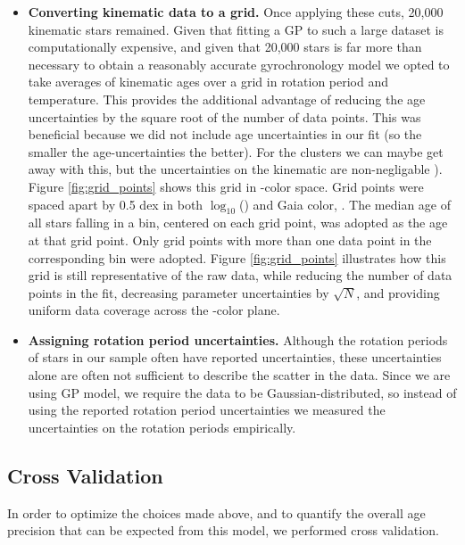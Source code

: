 \begin{itemize}
\item {\bf Converting kinematic data to a grid.}
Once applying these cuts, 20,000 kinematic stars remained.
        Given that fitting a GP to such a large dataset is computationally
        expensive, and given that 20,000 stars is far more than necessary to
        obtain a reasonably accurate gyrochronology model
        we opted to take averages of kinematic ages
        over a grid in rotation period and temperature.
This provides the additional advantage of reducing the age uncertainties by
        the square root of the number of data points.
        This was beneficial because we did not include age uncertainties in
        our fit (so the smaller the age-uncertainties the better).
For the clusters we can maybe get away with this, but the uncertainties on the
kinematic are non-negligable \citep[likely 1-2 Gyr][]{lu2021}).
Figure \ref{fig:grid_points} shows this grid in \prot-color space.
        Grid points were spaced apart by 0.5 dex in both $\log_{10}$(\prot)
        and Gaia color, \gcolor.
The median age of all stars falling in a bin, centered on each grid point, was
adopted as the age at that grid point.
Only grid points with more than one data point in the corresponding bin were
adopted.
Figure \ref{fig:grid_points} illustrates how this grid is still representative
of the raw data, while reducing the number of data points in the fit,
decreasing parameter uncertainties by $\sqrt N$, and providing uniform data
coverage across the \prot-color plane.

\item {\bf Assigning rotation period uncertainties.}
    Although the rotation periods of stars in our sample often have reported
uncertainties, these uncertainties alone are often not sufficient to describe
the scatter in the data.
Since we are using GP model, we require the data to be Gaussian-distributed,
so instead of using the reported rotation period uncertainties we measured the
uncertainties on the rotation periods empirically.
\end{itemize}

\subsection{Cross Validation}
In order to optimize the choices made above, and to quantify the overall age
precision that can be expected from this model, we performed cross validation.

